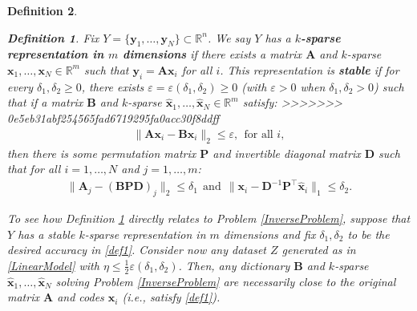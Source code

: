 \documentclass[9pt,twocolumn]{pnas-new}
\newtheorem{definition}{Definition}
\begin{document}
\begin{definition}
 
\begin{definition}\label{maindef}
Fix $Y = \{ \mathbf{y}_1, \ldots, \mathbf{y}_N\} \subset \mathbb{R}^n$. We say $Y$ has a \textbf{$k$-sparse representation in $m$ dimensions} if there exists a matrix $\mathbf{A}$ and $k$-sparse $\mathbf{x}_1, \ldots, \mathbf{x}_N \in \mathbb{R}^m$ such that $\mathbf{y}_i = \mathbf{A}\mathbf{x}_i$ for all $i$. %
This representation is \textbf{stable} if for every $\delta_1, \delta_2 \geq 0$, there exists $\varepsilon = \varepsilon(\delta_1, \delta_2) \geq 0$ (with $\varepsilon > 0$ when  $\delta_1, \delta_2 > 0$) such that if a matrix $\mathbf{B}$ and $k$-sparse $\mathbf{\hat x}_1, \ldots, \mathbf{\hat x}_N \in \mathbb{R}^m$ satisfy:
>>>>>>> 0e5eb31abf254565fad6719295fa0acc30f8ddff
\begin{align*}
\|\mathbf{A}\mathbf{x}_i - \mathbf{B}\mathbf{\hat x}_i\|_2 \leq \varepsilon, \ \ \text{for all $i$},
\end{align*}
%
then there is some permutation matrix $\mathbf{P}$ and invertible diagonal matrix $\mathbf{D}$ such that for all $i = 1,\ldots,N$ and $j = 1,\ldots,m$:
\begin{align}\label{def1}
\|\mathbf{A}_j - (\mathbf{BPD})_j\|_2 \leq \delta_1 \ \ \text{and} \ \ \|\mathbf{x}_i - \mathbf{D}^{-1}\mathbf{P}^{\top}\mathbf{\hat x}_i\|_1 \leq \delta_2.
\end{align}
\end{definition}

To see how Definition \ref{maindef} directly relates to Problem \ref{InverseProblem}, suppose that $Y$
has a stable $k$-sparse representation in $m$ dimensions and fix $\delta_1, \delta_2$ to be the desired accuracy in \eqref{def1}. Consider now any dataset $Z$ generated as in \eqref{LinearModel} with $\eta \leq \frac{1}{2} \varepsilon(\delta_1, \delta_2)$. Then, any dictionary $\mathbf{B}$ and $k$-sparse $\mathbf{\hat x}_1, \ldots, \mathbf{\hat x}_N$ solving Problem \ref{InverseProblem} are necessarily close to the original matrix $\mathbf{A}$ and codes $\mathbf{x}_i$ (i.e., satisfy \eqref{def1}). 


\end{definition}
\end{document}
